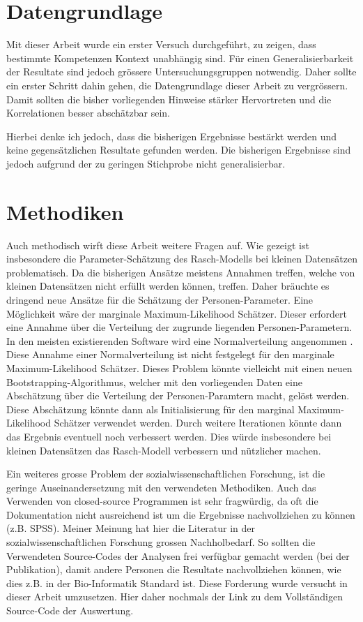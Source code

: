 \section{Datengrundlage}

Mit dieser Arbeit wurde ein erster Versuch durchgeführt, zu zeigen, dass bestimmte Kompetenzen Kontext unabhängig sind. Für einen Generalisierbarkeit der Resultate sind jedoch grössere Untersuchungsgruppen notwendig. Daher sollte ein erster Schritt dahin gehen, die Datengrundlage dieser Arbeit zu vergrössern. Damit sollten die bisher vorliegenden Hinweise stärker Hervortreten und die Korrelationen besser abschätzbar sein.

Hierbei denke ich jedoch, dass die bisherigen Ergebnisse bestärkt werden und keine gegensätzlichen Resultate gefunden werden. Die bisherigen Ergebnisse sind jedoch aufgrund der zu geringen Stichprobe nicht generalisierbar. 


\section{Methodiken}

Auch methodisch wirft diese Arbeit weitere Fragen auf. Wie gezeigt ist insbesondere die Parameter-Schätzung des Rasch-Modells bei kleinen Datensätzen problematisch. Da die bisherigen Ansätze meistens Annahmen treffen, welche von kleinen Datensätzen nicht erfüllt werden können, treffen. Daher bräuchte es dringend neue Ansätze für die Schätzung der Personen-Parameter. Eine Möglichkeit wäre der marginale Maximum-Likelihood Schätzer. Dieser erfordert eine Annahme über die Verteilung der zugrunde liegenden Personen-Parametern. In den meisten existierenden Software wird eine Normalverteilung angenommen \citep{Rost2004, Rizopoulos2006}. Diese Annahme einer Normalverteilung ist nicht festgelegt für den marginale Maximum-Likelihood Schätzer. Dieses Problem könnte vielleicht mit einen neuen Bootstrapping-Algorithmus, welcher mit den vorliegenden Daten eine Abschätzung über die Verteilung der Personen-Paramtern macht, gelöst werden. Diese Abschätzung könnte dann als Initialisierung für den marginal Maximum-Likelihood Schätzer verwendet werden. Durch weitere Iterationen könnte dann das Ergebnis eventuell noch verbessert werden. Dies würde insbesondere bei kleinen Datensätzen das Rasch-Modell verbessern und nützlicher machen.

Ein weiteres grosse Problem der sozialwissenschaftlichen Forschung, ist die geringe Auseinandersetzung mit den verwendeten Methodiken. Auch das Verwenden von closed-source Programmen ist sehr fragwürdig, da oft die Dokumentation nicht ausreichend ist um die Ergebnisse nachvollziehen zu können (z.B. SPSS).  Meiner Meinung hat hier die Literatur in der sozialwissenschaftlichen Forschung grossen Nachholbedarf. So sollten die Verwendeten Source-Codes der Analysen frei verfügbar gemacht werden (bei der Publikation), damit andere Personen die Resultate nachvollziehen können, wie dies z.B. in der Bio-Informatik Standard ist. Diese Forderung wurde versucht in dieser Arbeit umzusetzen. Hier daher nochmals der Link zu dem Vollständigen Source-Code der Auswertung.





